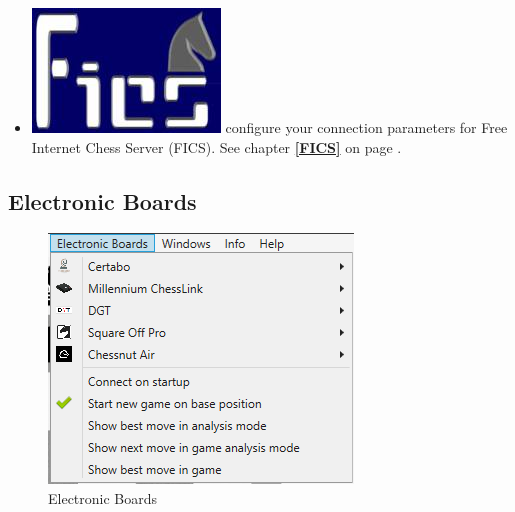 \documentclass[11pt,a4paper]{article}
\begin{document}
\begin{itemize}
    \item \includegraphics[scale=0.1]{FicsLogo.png} configure your connection parameters for Free Internet Chess Server (FICS). See chapter \textbf{\ref{FICS}  } on page \pageref{FICS}.		
\end{itemize}

\subsection{Electronic Boards}
\begin{figure}[H]
	\centering
	\includegraphics[scale=1.0]{ElectronicBoards.png}
	\caption{Electronic Boards}
	\label{fig:ElectronicBoards}
\end{figure}
\end{document}

